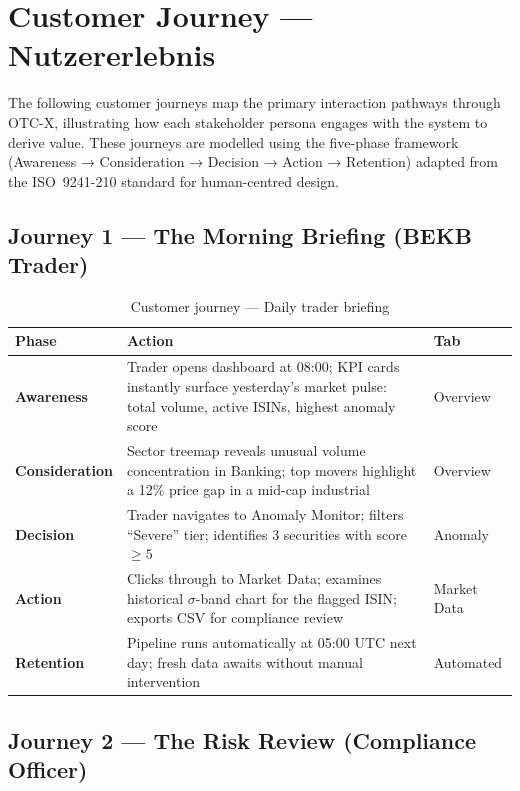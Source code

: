 \documentclass[
  11pt,
  a4paper,
  twoside,
  openany
]{report}
\begin{document}
\chapter{Customer Journey — Nutzererlebnis}
\label{ch:customer-journey}

The following customer journeys map the primary interaction pathways through OTC-X, illustrating how each stakeholder persona engages with the system to derive value.  These journeys are modelled using the five-phase framework (Awareness → Consideration → Decision → Action → Retention) adapted from the ISO~9241-210 standard for human-centred design.

\section{Journey 1 — The Morning Briefing (BEKB Trader)}

\begin{table}[H]
\centering
\caption{Customer journey — Daily trader briefing}
\label{tab:journey-trader}
\small
\begin{tabularx}{\textwidth}{>{\bfseries}l X l}
\toprule
\textbf{Phase} & \textbf{Action} & \textbf{Tab} \\
\midrule
Awareness     & Trader opens dashboard at 08:00; KPI cards instantly surface yesterday's market pulse: total volume, active ISINs, highest anomaly score & Overview \\
Consideration & Sector treemap reveals unusual volume concentration in Banking; top movers highlight a 12\% price gap in a mid-cap industrial & Overview \\
Decision      & Trader navigates to Anomaly Monitor; filters ``Severe'' tier; identifies 3 securities with score $\geq 5$ & Anomaly \\
Action        & Clicks through to Market Data; examines historical $\sigma$-band chart for the flagged ISIN; exports CSV for compliance review & Market Data \\
Retention     & Pipeline runs automatically at 05:00 UTC next day; fresh data awaits without manual intervention & Automated \\
\bottomrule
\end{tabularx}
\end{table}

\section{Journey 2 — The Risk Review (Compliance Officer)}
\end{document}
